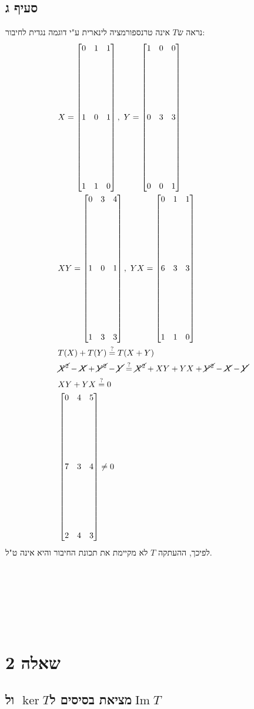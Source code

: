 \documentclass[11pt, oneside]{article}
\newcommand{\qed}{\R{$\blacksquare$}}
\newcommand{\br}{\\\\\\\\\\\\\\}
\DeclareMathOperator{\Ima}{Im}
\begin{document}
\subsection{סעיף ג}
נראה ש$T$ אינה טרנספורמציה לינארית ע"י דוגמה נגדית לחיבור:
\begin{eqnarray*}
& X = \begin{bmatrix}
0 & 1 & 1\br
1 & 0 & 1\br
1 & 1 & 0
\end{bmatrix},\ Y = \begin{bmatrix}
1 & 0 & 0\br
0 & 3 & 3\br
0 & 0 & 1
\end{bmatrix}\\
& XY = \begin{bmatrix}
0 & 3 & 4\br
1 & 0 & 1\br
1 & 3 & 3
\end{bmatrix},\ YX = \begin{bmatrix}
0 & 1 & 1\br
6 & 3 & 3\br
1 & 1 & 0
\end{bmatrix}\\
& T(X) + T(Y) \overset{?}{=} T(X + Y)\\
& \cancel{X^2} - \cancel{X} + \cancel{Y^2} - \cancel{Y} \overset{?}{=} \cancel{X^2} + XY + YX + \cancel{Y^2} - \cancel{X} - \cancel{Y}\\
& XY + YX \overset{?}{=} 0\\
& \begin{bmatrix}
0 & 4 & 5\br
7 & 3 & 4\br
2 & 4 & 3
\end{bmatrix} \neq 0
\end{eqnarray*}
לפיכך, ההעתקה $T$ לא מקיימת את תכונת החיבור והיא אינה ט"ל.
\br\qed
\clearpage

\section{שאלה 2}
\subsection{מציאת בסיסים ל$\ker T$ ול$\Ima T$}
\end{document}
